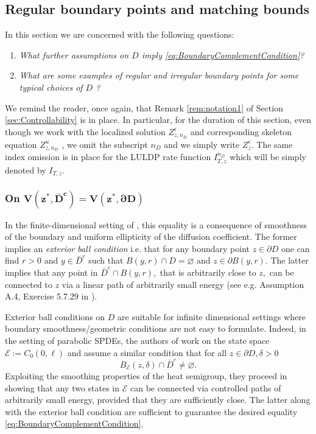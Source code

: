 \documentclass[10pt, reqno]{amsart}
\newcommand{\e}{\mathcal{E}}
\theoremstyle{definition}
\numberwithin{lem}{section}
\numberwithin{cor}{section}
\numberwithin{prop}{section}
\numberwithin{thm}{section}
\numberwithin{dfn}{section}
\begin{document}
 \subsection{Regular boundary points and matching bounds}\label{Sec:BoundaryPoints}  In this section we are concerned with the following questions:
\begin{enumerate}
    \item \textit{What further assumptions on $D$ imply \eqref{eq:BoundaryComplementCondition}?} 
    \item \textit{What are some examples of regular and irregular boundary points for some typical choices of $D$ ?}
    \end{enumerate}
We remind the reader, once again, that Remark \ref{rem:notation1} of Section \ref{sec:Controllability} is in place. In particular, for the duration of this section, even though we work with the localized solution $Z_{z,n_{D}}^\epsilon$ and corresponding skeleton equation $Z^u_{z,n_{D}}$ , we omit the subscript $n_D$ and we simply write $Z_z^\epsilon$. The same index omission is in place for the LULDP rate function $I^{n_D}_{T,z}$ which will be simply denoted by $I_{T,z}.$












    
    \subsubsection{\textbf{On $\mathbf{V(z^*, \bar{D}^c)=V(z^*, \partial D)}$}} In the finite-dimensional setting of \cite{dembo2009large, freidlin1998random}, this equality is a consequence of smoothness of the boundary and uniform ellipticity of the diffusion coefficient. The former implies an \textit{exterior ball condition} i.e. that for any boundary point $z\in\partial D$ one can find $r>0$ and $y\in \bar{D}^c$ such that $B(y,r)\cap D=\varnothing$ and $z\in\partial B(y,r).$ The latter implies that any point in $\bar{D}^c\cap B(y,r),$ that is arbitrarily close to $z,$ can be connected to $z$ via a linear path of arbitrarily small energy (see e.g. Assumption A.4, Exercise 5.7.29 in \cite{dembo2009large}).

    Exterior ball conditions on $D$ are suitable for infinite dimensional settings where boundary smoothness/geometric conditions are not easy to formulate. Indeed, in the setting of parabolic SPDEs, the authors of \cite{salins2021metastability} work on the state space $\e:=C_0(0,\ell)$ and assume a similar condition that for all $z\in\partial D, \delta>0$
    $$B_\e(z, \delta)\cap\bar{D}^c\neq\varnothing. $$ 
    Exploiting the smoothing properties of the heat semigroup, they proceed in showing that any two states in $\e$ can be connected via controlled paths of arbitrarily small energy, provided that they are sufficiently close. The latter along with the exterior ball condition are sufficient to guarantee the desired equality \eqref{eq:BoundaryComplementCondition}.
\end{document}
